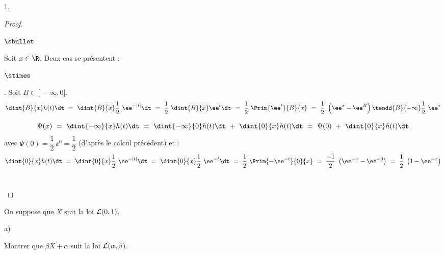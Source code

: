 \begin{noliste}{1.}
\begin{proof}
\begin{noliste}{$\sbullet$}
      \newpage


    \item Soit $x \in \R$. Deux cas se présentent :
      \begin{noliste}{$\stimes$}
      \item {}. Soit $B\in \ ]-\infty, 0[$.
        \[
        \dint{B}{x} h(t) \dt \ = \ \dint{B}{x} \dfrac{1}{2} \
        \ee^{-|t|} \dt \ = \ \dfrac{1}{2} \ \dint{B}{x} \ee^{t} \dt \
        = \ \dfrac{1}{2} \ \Prim{\ee^{t}}{B}{x} \ = \ \dfrac{1}{2} \
        \left(\ee^{x} - \ee^{B} \right) \tendd{B}{-\infty}
        \dfrac{1}{2} \ \ee^{x}
        \]
        
      \item {} 
        \[
        \Psi(x) \ = \ \dint{-\infty}{x} h(t) \dt \ = \
        \dint{-\infty}{0} h(t) \dt \ + \ \dint{0}{x} h(t) \dt \ = \
        \Psi(0) \ + \ \dint{0}{x} h(t) \dt
        \]
        avec $\Psi(0) = \dfrac{1}{2} \ \ee^{0} = \dfrac{1}{2}$
        (d'après le calcul précédent) et :
        \[
        \dint{0}{x} h(t) \dt \ = \ \dint{0}{x}
        \dfrac{1}{2} \ \ee^{-|t|} \dt \ = \ \dint{0}{x} \dfrac{1}{2} \
        \ee^{-t} \dt \ = \ \dfrac{1}{2} \ \Prim{-\ee^{-t}}{0}{x} \ = \
        \dfrac{-1}{2} \ \left(\ee^{-x} - \ee^{-0} \right) \ = \
        \dfrac{1}{2} \ \left(1 - \ee^{-x} \right)
        \]
        ~\\[-1.2cm]
      \end{noliste}      
    \end{noliste}
  \end{proof}
  
\item On suppose que $X$ suit la loi ${\cal L} (0,1)$.
  
  \begin{noliste}{a)}
    \setlength{\itemsep}{2mm} %
  \item Montrer que $\beta X+\alpha$ suit la loi ${\cal
      L}(\alpha,\beta)$.


\end{noliste}
\end{noliste}

